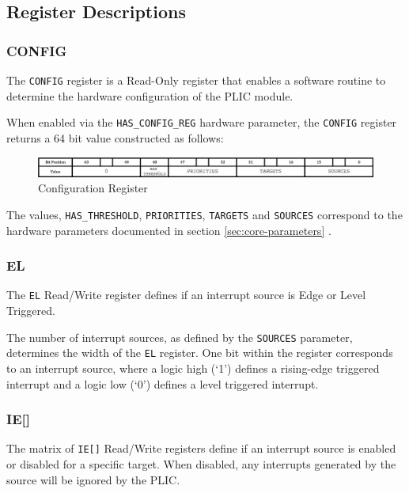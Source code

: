 \subsection{Register Descriptions}

\subsubsection{CONFIG}

The \texttt{CONFIG} register is a Read-Only register that enables a
software routine to determine the hardware configuration of the PLIC
module.

When enabled via the \texttt{HAS\_CONFIG\_REG} hardware parameter, the
\texttt{CONFIG} register returns a 64 bit value constructed as follows:

\begin{figure}[h] 
	\includegraphics[width=\linewidth]{assets/img/CONFIG} 
	\caption[Configuration Register]{Configuration Register}
	\label{fig:configreg}
\end{figure}



The values, \texttt{HAS\_THRESHOLD}, \texttt{PRIORITIES},
\texttt{TARGETS} and \texttt{SOURCES} correspond to the hardware
parameters documented in section \ref{sec:core-parameters} .

\subsubsection{EL}

The \texttt{EL} Read/Write register defines if an interrupt source is
Edge or Level Triggered.

The number of interrupt sources, as defined by the
\texttt{SOURCES} parameter, determines the width of the \texttt{EL} register. 
One bit within the register corresponds to an interrupt source, where a 
logic high (`1') defines a rising-edge triggered interrupt and a logic 
low (`0') defines a level triggered interrupt.

\subsubsection{IE[]}

The matrix of \texttt{IE[]} Read/Write registers define if an
interrupt source is enabled or disabled for a specific target. When
disabled, any interrupts generated by the source will be ignored by the
PLIC.


